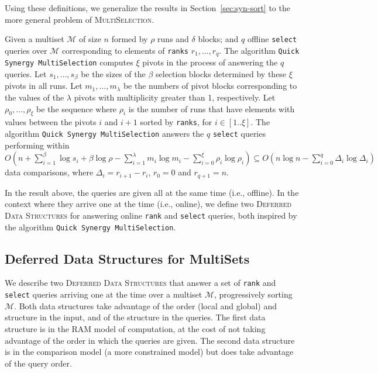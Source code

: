 Using these definitions, we generalize the results in Section~\ref{sec:syn-sort} to the more general problem of \textsc{MultiSelection}.

\begin{theorem}\label{theo:qsms}
  Given a multiset $\mathcal{M}$ of size $n$ formed by $\rho$ runs and
  $\delta$ blocks; and $q$ offline \texttt{select} queries over
  $\mathcal{M}$ corresponding to elements of \texttt{ranks}
  $r_1, \dots, r_q$. The algorithm \texttt{Quick Synergy
    MultiSelection} computes $\xi$ pivots in the process of answering
  the $q$ queries. Let $s_1,\dots, s_{\beta}$ be the sizes of the
  $\beta$ selection blocks determined by these $\xi$ pivots in all
  runs. Let $m_1, \dots, m_\lambda$ be the numbers of pivot blocks
  corresponding to the values of the $\lambda$ pivots with
  multiplicity greater than 1, respectively.  Let
  $\rho_0, \dots, \rho_\xi$ be the sequence where $\rho_i$ is the
  number of runs that have elements with values between the pivots $i$
  and $i+1$ sorted by \texttt{ranks}, for $i\in[1..\xi]$.  The
  algorithm \texttt{Quick Synergy MultiSelection} answers the $q$
  \texttt{select} queries performing within
  $O(n + \sum^{\beta}_{i=1}\log{s_i} +
    \beta\log{\rho}-\sum^{\lambda}_{i=1}m_i\log{m_i} -
    \sum^{\xi}_{i=0}\rho_i\log{\rho_i}) \subseteq
  O(n\log{n} - \sum^{q}_{i=0}\Delta_i\log{\Delta_i})$ data
  comparisons, where $\Delta_i = r_{i+1} - r_i$, $r_0=0$ and
  $r_{q+1}=n$.
\end{theorem}

In the result above, the queries are given all at the same time (i.e.,
offline). In the context where they arrive one at the time (i.e., online), we define
two \textsc{Deferred Data Structures} for answering online
\texttt{rank} and \texttt{select} queries, both inspired by the algorithm
\texttt{Quick Synergy MultiSelection}.

\subsection{Deferred Data Structures for MultiSets}
\label{sec:dds}

We describe two \textsc{Deferred Data Structures} that answer a set of \texttt{rank} and \texttt{select} queries arriving one at the time over a multiset $\mathcal{M}$, progressively sorting $\mathcal{M}$.  
%
Both data structures take advantage of the order (local and global) and structure in the input, and of the structure in the queries.
%
The first data structure is in the RAM model of computation, at the cost of not taking advantage of the order in which the queries are given. The second data structure is in the comparison model (a more constrained model) but does take advantage of the query order.

